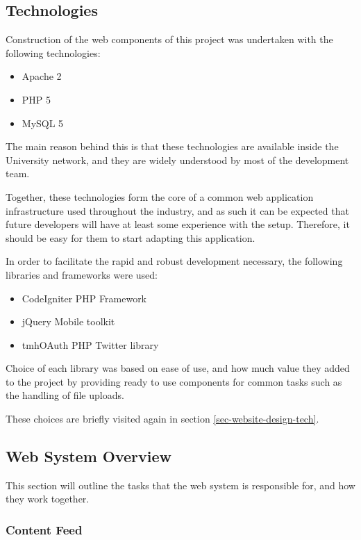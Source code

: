 \subsection{Technologies}\label{sec-web-technologies}

Construction of the web components of this project was undertaken with the following technologies:

\begin{itemize}
	\item Apache 2
	\item PHP 5
	\item MySQL 5
\end{itemize}

The main reason behind this is that these technologies are available inside the University network, and they are widely understood by most of the development team.

Together, these technologies form the core of a common web application infrastructure used throughout the industry, and as such it can be expected that future developers will have at least some experience with the setup. Therefore, it should be easy for them to start adapting this application.

In order to facilitate the rapid and robust development necessary, the following libraries and frameworks were used:

\begin{itemize}
	\item CodeIgniter PHP Framework
	\item jQuery Mobile toolkit
	\item tmhOAuth PHP Twitter library
\end{itemize}

Choice of each library was based on ease of use, and how much value they added to the project by providing ready to use components for common tasks such as the handling of file uploads.

These choices are briefly visited again in section \ref{sec-website-design-tech}.

\subsection{Web System Overview}
This section will outline the tasks that the web system is responsible for, and how they work together.

\subsubsection{Content Feed}

